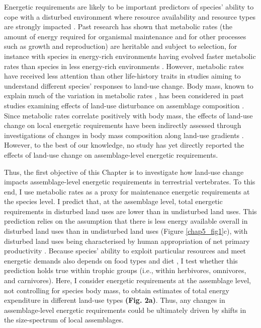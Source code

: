 Energetic requirements are likely to be important predictors of species’ ability to cope with a disturbed environment where resource availability and resource types are strongly impacted \citep{Auer2020}. Past research has shown that metabolic rates (the amount of energy required for organismal maintenance and for other processes such as growth and reproduction) are heritable and subject to selection, for instance with species in energy-rich environments having evolved faster metabolic rates than species in less energy-rich environments \citep{Mueller2001}. However, metabolic rates have received less attention than other life-history traits in studies aiming to understand different species’ responses to land-use change. Body mass, known to explain much of the variation in metabolic rates \citep{White2003, Hudson2013, Bushuev2018}, has been considered in past studies examining effects of land-use disturbance on assemblage composition \citep{Hevia2017}. Since metabolic rates correlate positively with body mass, the effects of land-use change on local energetic requirements have been indirectly assessed through investigations of changes in body mass composition along land-use gradients \citep{Newbold2020a, Tinoco2018}. However, to the best of our knowledge, no study has yet directly reported the effects of land-use change on assemblage-level energetic requirements. 

Thus, the first objective of this Chapter is to investigate how land-use change impacts assemblage-level energetic requirements in terrestrial vertebrates. To this end, I use metabolic rates as a proxy for maintenance energetic requirements at the species level. I predict that, at the assemblage level, total energetic requirements in disturbed land uses are lower than in undisturbed land uses. This prediction relies on the assumption that there is less energy available overall in disturbed land uses than in undisturbed land uses (Figure \ref{chap5_fig1}c), with disturbed land uses being characterised by human appropriation of net primary productivity \citep{Krausmann2013}. Because species’ ability to exploit particular resources and meet energetic demands also depends on food types and diet \citep{Mendoza2019, McNab1986}, I test whether this prediction holds true within trophic groups (i.e., within herbivores, omnivores, and carnivores). Here, I consider energetic requirements at the assemblage level, not controlling for species body mass, to obtain estimates of total energy expenditure in different land-use types \textbf{(Fig. 2a)}. Thus, any changes in assemblage-level energetic requirements could be ultimately driven by shifts in the size-spectrum of local assemblages. 

